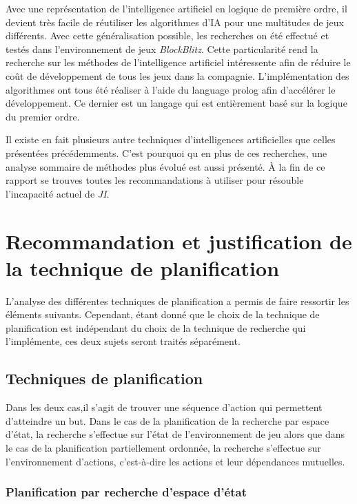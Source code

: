 \documentclass[12pt,english,frenchb,letterpaper]{article}
\begin{document}
Avec une représentation de l'intelligence artificiel en logique de première ordre, il devient très facile de réutiliser les algorithmes d'IA pour une multitudes de jeux différents. Avec cette généralisation possible, les recherches on été effectué et testés dans l'environnement de jeux \textit{BlockBlitz}. Cette particularité rend la recherche sur les méthodes de l'intelligence artificiel intéressente afin de réduire le coût de développement de tous les jeux dans la compagnie. L'implémentation des algorithmes ont tous été réaliser à l'aide du language prolog afin d'accélérer le développement. Ce dernier est un langage qui est entièrement basé sur la logique du premier ordre.

Il existe en fait plusieurs autre techniques d'intelligences artificielles que celles présentées précédemments. C'est pourquoi qu en plus de ces recherches, une analyse sommaire de méthodes plus évolué est aussi présenté. À la fin de ce rapport se trouves toutes les recommandations à utiliser pour résouble l'incapacité actuel de \textit{JI}.


\section{Recommandation et justification de la technique de planification}
L'analyse des différentes techniques de planification a permis de faire ressortir les éléments suivants.  Cependant, étant donné que le choix de la technique de planification est indépendant du choix de la technique de recherche qui l'implémente, ces deux sujets seront traités séparément.

\subsection{Techniques de planification}
Dans les deux cas,il s'agit de trouver une séquence d'action qui permettent d'atteindre un but. Dans le cas de la planification de la recherche par espace d'état, la recherche s'effectue sur l'état de l'environnement de jeu alors que dans le cas de la planification partiellement ordonnée, la recherche s'effectue sur l'environnement d'actions, c'est-à-dire les actions et leur dépendances mutuelles. 

\subsubsection{Planification par recherche d'espace d'état}
\end{document}

